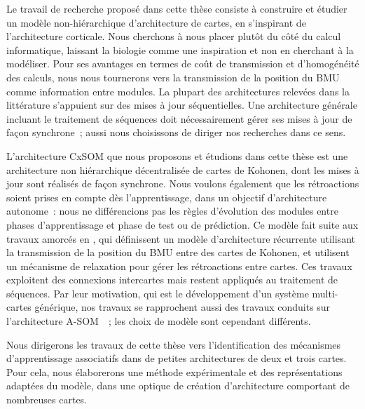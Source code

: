 \documentclass[../main]{subfiles}
\begin{document}
Le travail de recherche proposé dans cette thèse consiste à construire et étudier un modèle non-hiérarchique d'architecture de cartes, en s'inspirant de l'architecture corticale. Nous cherchons à nous placer plutôt du côté du calcul informatique, laissant la biologie comme une inspiration et non en cherchant à la modéliser.
Pour ses avantages en termes de coût de transmission et d'homogénéité des calculs, nous nous tournerons vers la transmission de la position du BMU comme information entre modules.
La plupart des architectures relevées dans la littérature s'appuient sur des mises à jour séquentielles. 
Une architecture générale incluant le traitement de séquences doit nécessairement gérer ses mises à jour de façon synchrone~; aussi nous choisissons de diriger nos recherches dans ce sens.

L'architecture CxSOM que nous proposons et étudions dans cette thèse est une architecture non hiérarchique décentralisée de cartes de Kohonen, dont les mises à jour sont réalisés de façon synchrone. Nous voulons également que les rétroactions soient prises en compte dès l'apprentissage, dans un objectif d'architecture autonome~: nous ne différencions pas les règles d'évolution des modules entre phases d'apprentissage et phase de test ou de prédiction.
Ce modèle fait suite aux travaux amorcés en \cite{baheux_towards_2014}, qui définissent un modèle d'architecture récurrente utilisant la transmission de la position du BMU entre des cartes de Kohonen, et utilisent un mécanisme de relaxation pour gérer les rétroactions entre cartes. 
Ces travaux exploitent des connexions intercartes mais restent appliqués au traitement de séquences.
Par leur motivation, qui est le développement d'un système multi-cartes générique, nos travaux se rapprochent aussi des travaux conduits sur l'architecture A-SOM~\cite{johnsson_associating_2008, johnsson_associative_2009,gil_sarasom_2015, Buonamente2015DiscriminatingAS}~; les choix de modèle sont cependant différents.

Nous dirigerons les travaux de cette thèse vers l'identification des mécanismes d'apprentissage associatifs dans de petites architectures de deux et trois cartes. Pour cela, nous élaborerons une méthode expérimentale et des représentations adaptées du modèle, dans une optique de création d'architecture comportant de nombreuses cartes.


\ifSubfilesClassLoaded{
    \printbibliography
}{}
\end{document}
